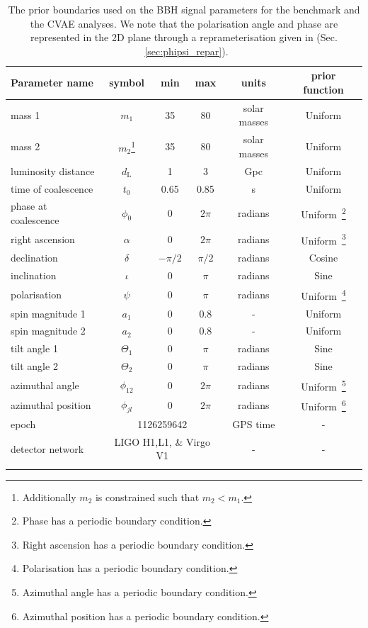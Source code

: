 %
%
\begin{table}
\centering
\caption{The prior boundaries used on the \ac{BBH} signal parameters for the benchmark and the \ac{CVAE} analyses. We note that the polarisation angle and phase are represented in the 2D plane through a reprameterisation given in (Sec. ~\ref{sec:phipsi_repar}).}
\begin{minipage}{\linewidth}
\begin{center}
\begin{tabular}[t]{lccccc}
\toprule
Parameter name & symbol & min & max & units & prior function \\
\hline
mass 1 & $m_1$ & 35 & 80 & solar masses & Uniform \\
mass 2 & $m_2$\footnote{Additionally $m_2$ is constrained such that
$m_{2}<m_{1}$.} & 35 & 80 & solar masses & Uniform \\
luminosity distance & $d_{\text{L}}$ & 1 & 3 & Gpc & Uniform \\
time of coalescence & $t_{0}$ & 0.65 & 0.85 & s & Uniform \\
phase at coalescence & $\phi_{0}$ & 0 & $2\pi$ & radians & Uniform~\footnote{Phase 
has a periodic boundary condition.} \\
right ascension & $\alpha$ & 0 & $2\pi$ & radians & Uniform~\footnote{Right ascension 
has a periodic boundary condition.} \\
declination & $\delta$ & $-\pi/2$ & $\pi/2$ & radians & Cosine \\
inclination & $\iota$ & 0 & $\pi$ & radians & Sine \\
polarisation & $\psi$ & 0 & $\pi$ & radians & Uniform~\footnote{Polarisation 
has a periodic boundary condition.} \\
spin magnitude 1 & $a_1$ & 0 & 0.8 & - & Uniform \\
spin magnitude 2 & $a_2$ & 0 & 0.8 & - & Uniform \\
tilt angle 1 & $\Theta_1$ & 0 & $\pi$ & radians & Sine \\
tilt angle 2 & $\Theta_2$ & 0 & $\pi$ & radians & Sine \\
azimuthal angle & $\phi_{12}$ & 0 & $2\pi$ & radians & Uniform~\footnote{Azimuthal angle  
has a periodic boundary condition.} \\
azimuthal position & $\phi_{jl}$ & 0 & $2\pi$ & radians & Uniform~\footnote{Azimuthal position  
has a periodic boundary condition.} \\
\hline
epoch & \multicolumn{3}{c}{1126259642} & GPS time & - \\
detector network & \multicolumn{3}{c}{LIGO H1,L1, \& Virgo V1} & - & - \\
\botrule
\end{tabular}
\end{center}
\label{tab:prior_ranges}
\end{minipage}
\end{table}

